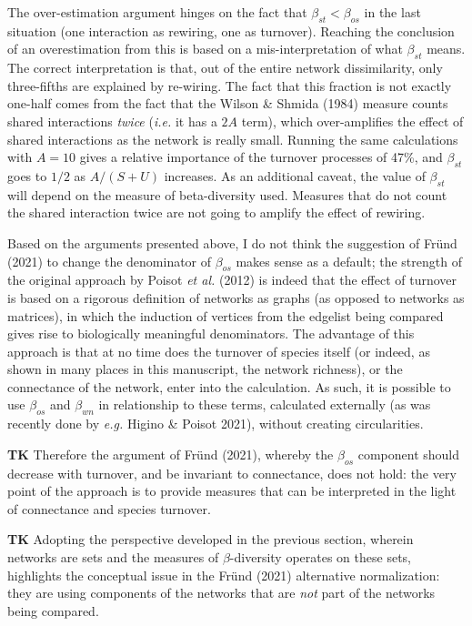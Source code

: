 \documentclass[11pt]{article}
\begin{document}
The over-estimation argument hinges on the fact that
\(\beta_{st} < \beta_{os}\) in the last situation (one interaction as
rewiring, one as turnover). Reaching the conclusion of an overestimation
from this is based on a mis-interpretation of what \(\beta_{st}\) means.
The correct interpretation is that, out of the entire network
dissimilarity, only three-fifths are explained by re-wiring. The fact
that this fraction is not exactly one-half comes from the fact that the
Wilson \& Shmida (1984) measure counts shared interactions \emph{twice}
(\emph{i.e.} it has a \(2A\) term), which over-amplifies the effect of
shared interactions as the network is really small. Running the same
calculations with \(A = 10\) gives a relative importance of the turnover
processes of 47\%, and \(\beta_{st}\) goes to \(1/2\) as \(A/(S+U)\)
increases. As an additional caveat, the value of \(\beta_{st}\) will
depend on the measure of beta-diversity used. Measures that do not count
the shared interaction twice are not going to amplify the effect of
rewiring.

Based on the arguments presented above, I do not think the suggestion of
Fründ (2021) to change the denominator of \(\beta_{os}\) makes sense as
a default; the strength of the original approach by Poisot \emph{et al.}
(2012) is indeed that the effect of turnover is based on a rigorous
definition of networks as graphs (as opposed to networks as matrices),
in which the induction of vertices from the edgelist being compared
gives rise to biologically meaningful denominators. The advantage of
this approach is that at no time does the turnover of species itself (or
indeed, as shown in many places in this manuscript, the network
richness), or the connectance of the network, enter into the
calculation. As such, it is possible to use \(\beta_{os}\) and
\(\beta_{wn}\) in relationship to these terms, calculated externally (as
was recently done by \emph{e.g.} Higino \& Poisot 2021), without
creating circularities.

\textbf{TK} Therefore the argument of Fründ (2021), whereby the
\(\beta_{os}\) component should decrease with turnover, and be invariant
to connectance, does not hold: the very point of the approach is to
provide measures that can be interpreted in the light of connectance and
species turnover.

\textbf{TK} Adopting the perspective developed in the previous section,
wherein networks are sets and the measures of \(\beta\)-diversity
operates on these sets, highlights the conceptual issue in the Fründ
(2021) alternative normalization: they are using components of the
networks that are \emph{not} part of the networks being compared.
\end{document}
